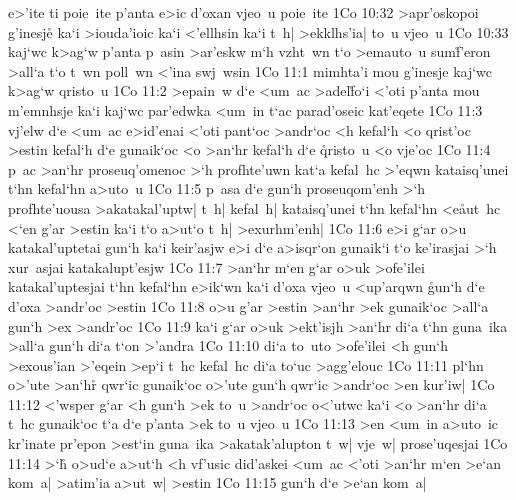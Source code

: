 e>'ite
ti
poie~ite
p'anta
e>ic
d'oxan
vjeo~u
poie~ite\bibvsend
\vs 1Co 10:32
>apr'oskopoi
g'inesje\r{}
ka`i
>iouda'ioic
ka`i
<'ellhsin
ka`i
t~h|
>ekklhs'ia|
to~u
vjeo~u\bibvsend
\vs 1Co 10:33
kaj`wc
k>ag`w
p'anta
p~asin
>ar'eskw
m`h
vzht~wn
t`o
>emauto~u
sum\r{f}'eron
>all`a
t`o
t~wn
poll~wn
<'ina
swj~wsin\bibvsend
\vs 1Co 11:1
mimhta'i
mou
g'inesje
kaj`wc
k>ag`w
qristo~u\bibvsend
\vs 1Co 11:2
>epain~w
d`e
<um~ac
>adel\r{f}o`i
<'oti
p'anta
mou
m'emnhsje
ka`i
kaj`wc
par'edwka
<um~in
t`ac
parad'oseic
kat'eqete\bibvsend
\vs 1Co 11:3
vj'elw
d`e
<um~ac
e>id'enai
<'oti
pant`oc
>andr`oc
<h
kefal`h
<o
qrist'oc
>estin
kefal`h
d`e
gunaik`oc
<o
>an`hr
kefal`h
d`e
\r{q}risto~u
<o
vje'oc\bibvsend
\vs 1Co 11:4
p~ac
>an`hr
proseuq'omenoc
>`h
profhte'uwn
kat`a
kefal~hc
>'eqwn
kataisq'unei
t`hn
kefal`hn
a>uto~u\bibvsend
\vs 1Co 11:5
p~asa
d`e
gun`h
proseuqom'enh
>`h
profhte'uousa
>akatakal'uptw|
t~h|
kefal~h|
kataisq'unei
t`hn
kefal`hn
<e\r{a}ut~hc
<`en
g'ar
>estin
ka`i
t`o
a>ut`o
t~h|
>exurhm'enh|\bibvsend
\vs 1Co 11:6
e>i
g`ar
o>u
katakal'uptetai
gun`h
ka`i
keir'asjw
e>i
d`e
a>isqr`on
gunaik`i
t`o
ke'irasjai
>`h
xur~asjai
katakalupt'esjw\bibvsend
\vs 1Co 11:7
>an`hr
m`en
g`ar
o>uk
>ofe'ilei
katakal'uptesjai
t`hn
kefal`hn
e>ik`wn
ka`i
d'oxa
vjeo~u
<up'arqwn
\r{g}un`h
d`e
d'oxa
>andr'oc
>estin\bibvsend
\vs 1Co 11:8
o>u
g'ar
>estin
>an`hr
>ek
gunaik`oc
>all`a
gun`h
>ex
>andr'oc\bibvsend
\vs 1Co 11:9
ka`i
g`ar
o>uk
>ekt'isjh
>an`hr
di`a
t`hn
guna~ika
>all`a
gun`h
di`a
t`on
>'andra\bibvsend
\vs 1Co 11:10
di`a
to~uto
>ofe'ilei
<h
gun`h
>exous'ian
>'eqein
>ep`i
t~hc
kefal~hc
di`a
to`uc
>agg'elouc\bibvsend
\vs 1Co 11:11
pl`hn
o>'ute
>an`hr\r{}
qwr`ic
gunaik`oc
o>'ute
gun`h
qwr`ic
>andr`oc
>en
kur'iw|\bibvsend
\vs 1Co 11:12
<'wsper
g`ar
<h
gun`h
>ek
to~u
>andr`oc
o<'utwc
ka`i
<o
>an`hr
di`a
t~hc
gunaik`oc
t`a
d`e
p'anta
>ek
to~u
vjeo~u\bibvsend
\vs 1Co 11:13
>en
<um~in
a>uto~ic
kr'inate
pr'epon
>est`in
guna~ika
>akatak'alupton
t~w|
vje~w|
prose'uqesjai\bibvsend
\vs 1Co 11:14
>`h\r{}
o>ud`e
a>ut`h
<h
vf'usic
did'askei
<um~ac
<'oti
>an`hr
m`en
>e`an
kom~a|
>atim'ia
a>ut~w|
>estin\bibvsend
\vs 1Co 11:15
gun`h
d`e
>e`an
kom~a|
